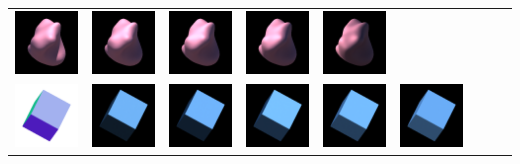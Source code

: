 \begin{center}
\begin{longtable}{@{}c@{}c@{}c@{}c@{}c@{}c@{}c@{}c@{}c@{}}
\includegraphics[width=0.1\linewidth]{training/4_3.png} & \includegraphics[width=0.1\linewidth]{training/4_4.png} &
\includegraphics[width=0.1\linewidth]{training/4_5.png} & \includegraphics[width=0.1\linewidth]{training/4_6.png} &
\includegraphics[width=0.1\linewidth]{training/4_7.png} \\
\includegraphics[width=0.1\linewidth]{training/5_gt.png} & \includegraphics[width=0.1\linewidth]{training/5_0.png} &
\includegraphics[width=0.1\linewidth]{training/5_1.png} & \includegraphics[width=0.1\linewidth]{training/5_2.png} &
\includegraphics[width=0.1\linewidth]{training/5_3.png} & \includegraphics[width=0.1\linewidth]{training/5_4.png} &

\end{longtable}
\end{center}

